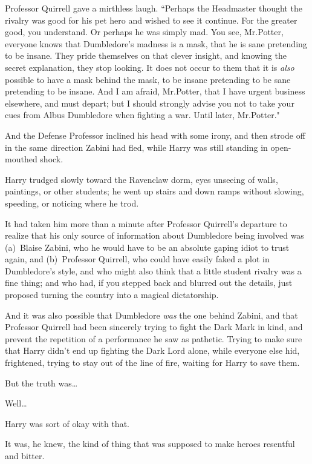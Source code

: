 Professor Quirrell gave a mirthless laugh. ``Perhaps the Headmaster thought the rivalry was good for his pet hero and wished to see it continue. For the greater good, you understand. Or perhaps he was simply mad. You see, Mr.\?Potter, everyone knows that Dumbledore's madness is a mask, that he is sane pretending to be insane. They pride themselves on that clever insight, and knowing the secret explanation, they stop looking. It does not occur to them that it is \emph{also} possible to have a mask behind the mask, to be insane pretending to be sane pretending to be insane. And I am afraid, Mr.\?Potter, that I have urgent business elsewhere, and must depart; but I should strongly advise you not to take your cues from Albus Dumbledore when fighting a war. Until later, Mr.\?Potter."

And the Defense Professor inclined his head with some irony, and then strode off in the same direction Zabini had fled, while Harry was still standing in open-mouthed shock.


Harry trudged slowly toward the Ravenclaw dorm, eyes unseeing of walls, paintings, or other students; he went up stairs and down ramps without slowing, speeding, or noticing where he trod.

It had taken him more than a minute after Professor Quirrell's departure to realize that his only source of information about Dumbledore being involved was (a)~Blaise Zabini, who he would have to be an absolute gaping idiot to trust again, and (b)~Professor Quirrell, who could have easily faked a plot in Dumbledore's style, and who might also think that a little student rivalry was a fine thing; and who had, if you stepped back and blurred out the details, just proposed turning the country into a magical dictatorship.

And it was also possible that Dumbledore \emph{was} the one behind Zabini, and that Professor Quirrell had been sincerely trying to fight the Dark Mark in kind, and prevent the repetition of a performance he saw as pathetic. Trying to make sure that Harry didn't end up fighting the Dark Lord alone, while everyone else hid, frightened, trying to stay out of the line of fire, waiting for Harry to save them.

But the truth was{\ldots}

Well{\ldots}

Harry was sort of okay with that.

It was, he knew, the kind of thing that was supposed to make heroes resentful and bitter.

